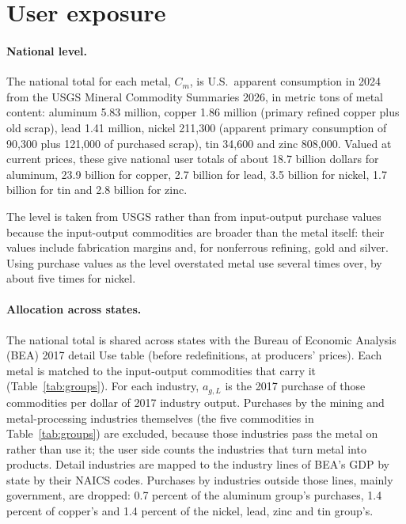 \documentclass[11pt]{article}
\begin{document}
\section{User exposure}\label{sec:user}

\paragraph{National level.} The national total for each metal, $C_m$, is U.S.\ apparent
consumption in 2024 from the USGS Mineral Commodity Summaries 2026, in metric tons of metal
content: aluminum 5.83 million, copper 1.86 million (primary refined copper plus old scrap),
lead 1.41 million, nickel 211,300 (apparent primary consumption of 90,300 plus 121,000 of
purchased scrap), tin 34,600 and zinc 808,000. Valued at current prices, these give national
user totals of about 18.7 billion dollars for aluminum, 23.9 billion for copper, 2.7 billion
for lead, 3.5 billion for nickel, 1.7 billion for tin and 2.8 billion for zinc.

The level is taken from USGS rather than from input-output purchase values because the
input-output commodities are broader than the metal itself: their values include fabrication
margins and, for nonferrous refining, gold and silver. Using purchase values as the level
overstated metal use several times over, by about five times for nickel.

\paragraph{Allocation across states.} The national total is shared across states with the
Bureau of Economic Analysis (BEA) 2017 detail Use table (before redefinitions, at producers'
prices). Each metal is matched to the input-output commodities that carry it
(Table~\ref{tab:groups}). For each industry, $a_{g,L}$ is the 2017 purchase of those
commodities per dollar of 2017 industry output. Purchases by the mining and metal-processing
industries themselves (the five commodities in Table~\ref{tab:groups}) are excluded, because
those industries pass the metal on rather than use it; the user side counts the industries
that turn metal into products. Detail industries are mapped to the industry lines of BEA's
GDP by state by their NAICS codes. Purchases by industries outside those lines, mainly
government, are dropped: 0.7 percent of the aluminum group's purchases, 1.4 percent of
copper's and 1.4 percent of the nickel, lead, zinc and tin group's.
\end{document}
